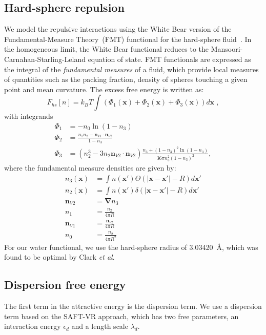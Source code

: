 \documentclass[letterpaper,twocolumn,amsmath,amssymb,prb]{revtex4-1}
\newcommand{\xx}{\textbf{x}}
\begin{document}
\subsection{Hard-sphere repulsion}

We model the repulsive interactions using the White Bear version of
the Fundamental-Measure Theory~(FMT) functional for the hard-sphere
fluid~\cite{roth2002whitebear}.  In the homogeneous limit, the White
Bear functional reduces to the Mansoori-Carnahan-Starling-Leland
equation of state.  FMT functionals are expressed as the integral of
the \emph{fundamental measures} of a fluid, which provide local
measures of quantities such as the packing fraction, density of
spheres touching a given point and mean curvature.  The excess free
energy is written as:
\begin{equation}
F_{hs}[n] = k_B T \int (\Phi_1(\xx) + \Phi_2(\xx) + \Phi_3(\xx)) d\xx \; ,
\end{equation}
with integrands
\begin{align}
\Phi_1 &= -n_0 \ln\left( 1 - n_3\right)\\
\Phi_2 &= \frac{n_1 n_2 - \mathbf{n}_{V1} \cdot\mathbf{n}_{V2}}{1-n_3} \\
\Phi_3 &= (n_2^3 - 3n_2 \mathbf{n}_{V2} \cdot \mathbf{n}_{V2})
  \frac{
    n_3 + (1-n_3)^2\ln(1-n_3)
  }{
    36\pi n_3^2\left( 1 - n_3 \right)^2
  } ,
\end{align}
where the fundamental measure densities are given by:
\begin{align}
  n_3(\xx) &= \int n(\xx') \Theta(\left|\xx - \xx'\right| - R) d\xx' \\
  n_2(\xx) &= \int n(\xx') \delta(\left|\xx - \xx'\right| - R) d\xx'
  \\
  \mathbf{n}_{V2} &= \mathbf{\nabla} n_3 \\
  n_1 &= \frac{n_2}{4\pi R}\\
  \mathbf{n}_{V1} &= \frac{\mathbf{n}_{V2}}{4\pi R}\\
  n_0 &= \frac{n_2}{4\pi R^2}
\end{align}
For our water functional, we use the hard-sphere radius of
3.03420~\AA, which was found to be optimal by Clark
\emph{et al}.\cite{clark2006developing}

\newcommand\etadisp{\ensuremath{\eta_\textit{d}}}
\newcommand\epsilondisp{\ensuremath{\epsilon_\textit{d}}}
\newcommand\epsilonassoc{\ensuremath{\epsilon_\textit{a}}}
\newcommand\lambdadisp{\ensuremath{\lambda_\textit{d}}}
\subsection{Dispersion free energy}
The first term in the attractive energy is the dispersion term.  We use a
dispersion term based on the SAFT-VR
approach\cite{gil-villegas-1997-SAFT-VR}, which has two free
parameters, an interaction energy $\epsilondisp$ and a
length scale $\lambdadisp$.
\end{document}
